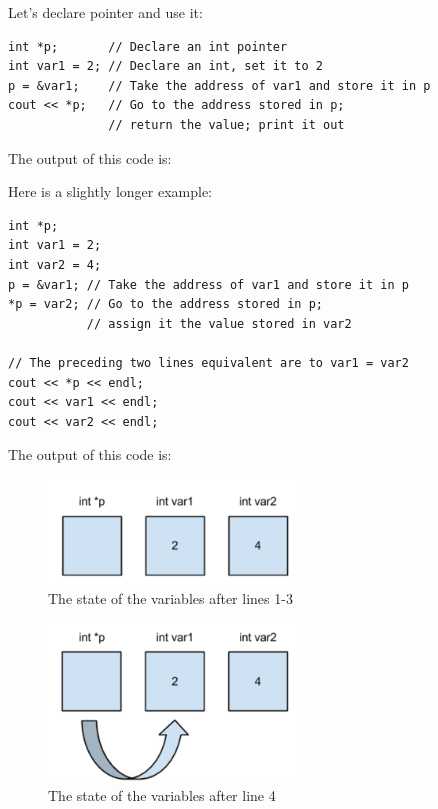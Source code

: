 Let's declare pointer  and use it:

\noindent\begin{minipage}{\linewidth}\begin{lstlisting}
int *p;       // Declare an int pointer
int var1 = 2; // Declare an int, set it to 2
p = &var1;    // Take the address of var1 and store it in p
cout << *p;   // Go to the address stored in p;
              // return the value; print it out
\end{lstlisting}\end{minipage}

\noindent The output of this code is:

\noindent {}

Here is a slightly longer example:

\noindent\begin{minipage}{\linewidth}\begin{lstlisting}
int *p;
int var1 = 2;
int var2 = 4;
p = &var1; // Take the address of var1 and store it in p
*p = var2; // Go to the address stored in p; 
           // assign it the value stored in var2

// The preceding two lines equivalent are to var1 = var2
cout << *p << endl;
cout << var1 << endl;
cout << var2 << endl;
\end{lstlisting}\end{minipage}

The output of this code is:

\noindent {}

\noindent {}

\noindent {}

\begin{figure}[tb]
  \centering
  \includegraphics[width=0.6\textwidth]{diagrams/pointer-example-1.pdf}
  \caption{The state of the variables after lines 1-3} \label{fig:pointer-example-1} 
\end{figure}

\begin{figure}[tb]
  \centering
  \includegraphics[width=0.6\textwidth]{diagrams/pointer-example-2.pdf}
  \caption{The state of the variables after line 4} \label{fig:pointer-example-2} 
\end{figure}

